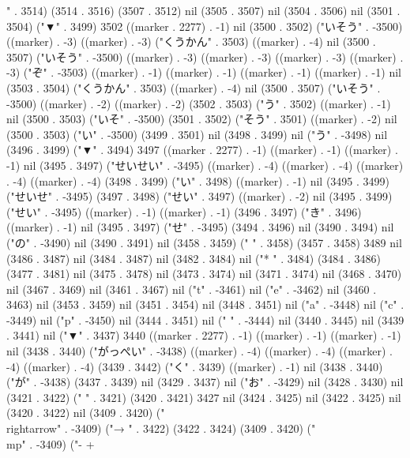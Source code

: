 " . 3514) (3514 . 3516) (3507 . 3512) nil (3505 . 3507) nil (3504 . 3506) nil (3501 . 3504) ("▼" . 3499) 3502 ((marker . 2277) . -1) nil (3500 . 3502) ("いそう" . -3500) ((marker) . -3) ((marker) . -3) ("くうかん" . 3503) ((marker) . -4) nil (3500 . 3507) ("いそう" . -3500) ((marker) . -3) ((marker) . -3) ((marker) . -3) ((marker) . -3) ("ぞ" . -3503) ((marker) . -1) ((marker) . -1) ((marker) . -1) ((marker) . -1) nil (3503 . 3504) ("くうかん" . 3503) ((marker) . -4) nil (3500 . 3507) ("いそう" . -3500) ((marker) . -2) ((marker) . -2) (3502 . 3503) ("う" . 3502) ((marker) . -1) nil (3500 . 3503) ("いそ" . -3500) (3501 . 3502) ("そう" . 3501) ((marker) . -2) nil (3500 . 3503) ("い" . -3500) (3499 . 3501) nil (3498 . 3499) nil ("う" . -3498) nil (3496 . 3499) ("▼" . 3494) 3497 ((marker . 2277) . -1) ((marker) . -1) ((marker) . -1) nil (3495 . 3497) ("せいせい" . -3495) ((marker) . -4) ((marker) . -4) ((marker) . -4) ((marker) . -4) (3498 . 3499) ("い" . 3498) ((marker) . -1) nil (3495 . 3499) ("せいせ" . -3495) (3497 . 3498) ("せい" . 3497) ((marker) . -2) nil (3495 . 3499) ("せい" . -3495) ((marker) . -1) ((marker) . -1) (3496 . 3497) ("き" . 3496) ((marker) . -1) nil (3495 . 3497) ("せ" . -3495) (3494 . 3496) nil (3490 . 3494) nil ("の" . -3490) nil (3490 . 3491) nil (3458 . 3459) (" " . 3458) (3457 . 3458) 3489 nil (3486 . 3487) nil (3484 . 3487) nil (3482 . 3484) nil ("*
" . 3484) (3484 . 3486) (3477 . 3481) nil (3475 . 3478) nil (3473 . 3474) nil (3471 . 3474) nil (3468 . 3470) nil (3467 . 3469) nil (3461 . 3467) nil ("t" . -3461) nil ("e" . -3462) nil (3460 . 3463) nil (3453 . 3459) nil (3451 . 3454) nil (3448 . 3451) nil ("a" . -3448) nil ("c" . -3449) nil ("p" . -3450) nil (3444 . 3451) nil (" " . -3444) nil (3440 . 3445) nil (3439 . 3441) nil ("▼" . 3437) 3440 ((marker . 2277) . -1) ((marker) . -1) ((marker) . -1) nil (3438 . 3440) ("がっぺい" . -3438) ((marker) . -4) ((marker) . -4) ((marker) . -4) ((marker) . -4) (3439 . 3442) ("く" . 3439) ((marker) . -1) nil (3438 . 3440) ("が" . -3438) (3437 . 3439) nil (3429 . 3437) nil ("お" . -3429) nil (3428 . 3430) nil (3421 . 3422) (" " . 3421) (3420 . 3421) 3427 nil (3424 . 3425) nil (3422 . 3425) nil (3420 . 3422) nil (3409 . 3420) ("\\rightarrow" . -3409) ("→
" . 3422) (3422 . 3424) (3409 . 3420) ("\\mp" . -3409) ("-
+
